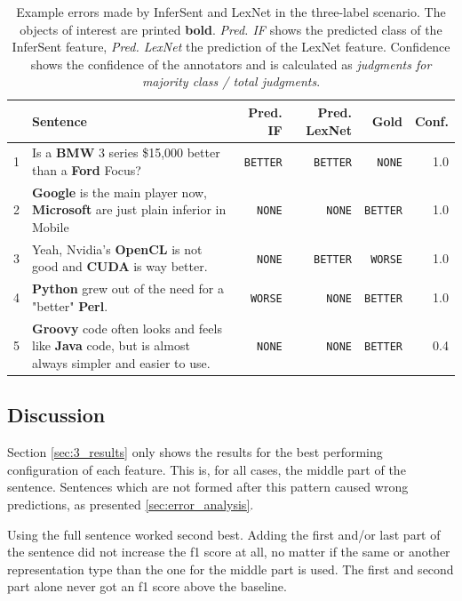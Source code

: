 \begin{table}[htbp]
\caption{Example errors made by InferSent and LexNet in the three-label scenario. The objects of interest are printed \textbf{bold}. \emph{Pred. IF} shows the predicted class of the InferSent feature, \emph{Pred. LexNet} the prediction of the LexNet feature. Confidence shows the confidence of the annotators and is calculated as \emph{judgments for majority class / total judgments}.}
\label{tbl:3_mistakes_both}
\begin{tabularx}{\linewidth}{lXrrrr}
\toprule
 & Sentence & Pred. IF & Pred. LexNet & Gold & Conf. \\ \midrule
1 & Is a \textbf{BMW} 3 series \$15,000 better than a \textbf{Ford} Focus? & \texttt{BETTER} & \texttt{BETTER} & \texttt{NONE} & 1.0\\ %

2 & \textbf{Google} is the main player now, \textbf{Microsoft} are just plain inferior in Mobile & \texttt{NONE} & \texttt{NONE} & \texttt{BETTER} & 1.0\\ %

3 & Yeah, Nvidia's \textbf{OpenCL} is not good and \textbf{CUDA} is way better. & \texttt{NONE} & \texttt{BETTER} & \texttt{WORSE} & 1.0\\ %

4 & \textbf{Python} grew out of the need for a "better" \textbf{Perl}. & \texttt{WORSE} & \texttt{NONE} & \texttt{BETTER} & 1.0\\

5 & \textbf{Groovy} code often looks and feels like \textbf{Java} code, but is almost always simpler and easier to use. & \texttt{NONE} & \texttt{NONE} & \texttt{BETTER} & 0.4\\ %

 \bottomrule
\end{tabularx}
\end{table}


\subsection{Discussion}
Section \ref{sec:3_results} only shows the results for the best performing configuration of each feature. This is, for all cases, the middle part of the sentence. Sentences which are not formed after this pattern caused wrong predictions, as presented \ref{sec:error_analysis}.

Using the full sentence worked second best. Adding the first and/or last part of the sentence did not increase the f1 score at all, no matter if the same or another representation type than the one for the middle part is used. The first and second part alone never got an f1 score above the baseline.

